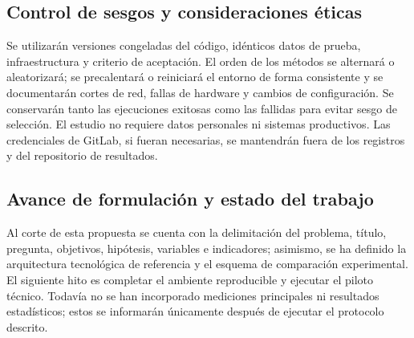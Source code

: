\documentclass[12pt,a4paper]{article}
\begin{document}
\subsection{Control de sesgos y consideraciones éticas}

Se utilizarán versiones congeladas del código, idénticos datos de prueba, infraestructura y criterio de aceptación. El orden de los métodos se alternará o aleatorizará; se precalentará o reiniciará el entorno de forma consistente y se documentarán cortes de red, fallas de hardware y cambios de configuración. Se conservarán tanto las ejecuciones exitosas como las fallidas para evitar sesgo de selección. El estudio no requiere datos personales ni sistemas productivos. Las credenciales de GitLab, si fueran necesarias, se mantendrán fuera de los registros y del repositorio de resultados.

\subsection{Avance de formulación y estado del trabajo}

Al corte de esta propuesta se cuenta con la delimitación del problema, título, pregunta, objetivos, hipótesis, variables e indicadores; asimismo, se ha definido la arquitectura tecnológica de referencia y el esquema de comparación experimental. El siguiente hito es completar el ambiente reproducible y ejecutar el piloto técnico. Todavía no se han incorporado mediciones principales ni resultados estadísticos; estos se informarán únicamente después de ejecutar el protocolo descrito.

\end{document}
